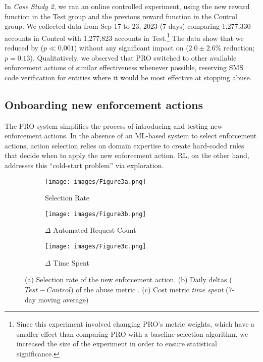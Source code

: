 In \emph{Case Study 2}, we ran an online controlled experiment, using the new reward function in the Test group and the previous reward function in the Control group.
We collected data from Sep 17 to 23, 2023 (7 days) comparing 1,277,330 accounts in Control with 1,277,823 accounts in Test.\footnote{Since this experiment involved changing PRO's metric weights, which have a smaller effect than comparing PRO with a baseline selection algorithm, we increased the size of the experiment in order to ensure statistical significance.}
The data show that we reduced \smscost by \textbf{\smsreduction} ($p \ll 0.001$) without any significant impact on \scraping ($2.0 \pm 2.6\%$ reduction; $p=0.13$). Qualitatively, we observed that PRO switched to other available enforcement actions of similar effectiveness whenever possible, reserving SMS code verification for entities where it would be most effective at stopping abuse.


\subsection{Onboarding new enforcement actions}
\label{ss:new_action}
The PRO system simplifies the process of introducing and testing new enforcement actions. In the absence of an ML-based system to select enforcement actions, action selection relies on domain expertise to create hard-coded rules that decide when to apply the new enforcement action. RL, on the other hand, addresses this ``cold-start problem'' via exploration.

\begin{figure*} %
\centering
\begin{subfigure}[t]{0.33\textwidth}
\texttt{[image: images/Figure3a.png]}
\caption{Selection Rate}\label{fig:chart_4_2}
\end{subfigure}
\begin{subfigure}[t]{0.33\textwidth}
\texttt{[image: images/Figure3b.png]}
\caption{$\Delta$ Automated Request Count}\label{fig:chart_4_1}
\end{subfigure}
\begin{subfigure}[t]{0.33\textwidth}
\texttt{[image: images/Figure3c.png]}
\caption{$\Delta$ Time Spent}\label{fig:chart_4_3}
\end{subfigure}
\captionsetup{justification=centering,margin=1cm}
\caption{(a) Selection rate of the new enforcement action. (b) Daily deltas ($Test-Control$) of the abuse metric \automation. (c) Cost metric {\em time spent} (7-day moving average)}\label{fig:adding_action}
\end{figure*}


